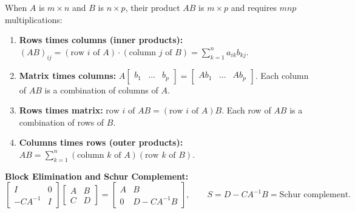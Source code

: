 \documentclass[11pt,a4paper,openany,oneside]{book}
\def\vect#1{#1}%
\def\mathbf#1{#1}%
\newcommand{\vect}[1]{\mathbf{#1}}
\numberwithin{equation}{chapter}
\begin{document}
\begin{result}
When $A$ is $m \times n$ and $B$ is $n \times p$, their product $AB$ is $m \times p$ and requires $mnp$ multiplications:
\begin{enumerate}
\item \textbf{Rows times columns (inner products):} $(AB)_{ij} = (\text{row } i \text{ of } A) \cdot (\text{column } j \text{ of } B) = \sum_{k=1}^n a_{ik}b_{kj}$.
\item \textbf{Matrix times columns:} $A\begin{bmatrix}\vect{b}_1 & \dots & \vect{b}_p\end{bmatrix} = \begin{bmatrix}A\vect{b}_1 & \dots & A\vect{b}_p\end{bmatrix}$. Each column of $AB$ is a combination of columns of $A$.
\item \textbf{Rows times matrix:} $\text{row } i \text{ of } AB = (\text{row } i \text{ of } A)B$. Each row of $AB$ is a combination of rows of $B$.
\item \textbf{Columns times rows (outer products):} $AB = \sum_{k=1}^n (\text{column } k \text{ of } A)(\text{row } k \text{ of } B)$.
\end{enumerate}
\textbf{Block Elimination and Schur Complement:}
\begin{equation}
\begin{bmatrix} I & \vect{0} \\ -CA^{-1} & I \end{bmatrix} \begin{bmatrix} A & B \\ C & D \end{bmatrix} = \begin{bmatrix} A & B \\ \vect{0} & D - CA^{-1}B \end{bmatrix}, \qquad S = D - CA^{-1}B = \text{Schur complement}.
\end{equation}
\end{result}
\end{document}
